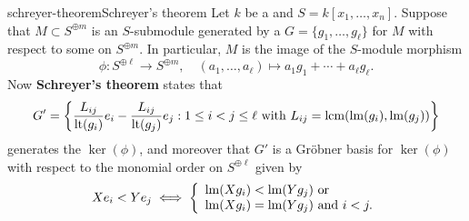\begin{topic}{schreyer-theorem}{Schreyer's theorem}
    Let $k$ be a  and $S = k[x_1, \ldots, x_n]$.
    Suppose that $M \subset S^{\oplus m}$ is an $S$-submodule generated by a  $G = \{ g_1, \ldots, g_\ell \}$ for $M$ with respect to some  on $S^{\oplus m}$. In particular, $M$ is the image of the $S$-module morphism
    \[ \phi \colon S^{\oplus \ell} \to S^{\oplus m}, \quad (a_1, \ldots, a_\ell) \mapsto a_1 g_1 + \cdots + a_\ell g_\ell . \]
    Now \textbf{Schreyer's theorem} states that
    \[ G' = \left\{ \frac{L_{ij}}{\operatorname{lt}(g_i)} e_i - \frac{L_{ij}}{\operatorname{lt}(g_j)} e_j : 1 \le i < j \le \ell \textup{ with } L_{ij} = \operatorname{lcm}(\operatorname{lm}(g_i), \operatorname{lm}(g_j)) \right\} \]
    generates the  $\ker(\phi)$, and moreover that $G'$ is a Gröbner basis for $\ker(\phi)$ with respect to the monomial order on $S^{\oplus \ell}$ given by
    \[ X e_i < Y e_j \iff \left\{ \begin{array}{l} \operatorname{lm}(X g_i) < \operatorname{lm}(Y g_j) \textup{ or } \\ \operatorname{lm}(X g_i) = \operatorname{lm}(Y g_j) \textup{ and } i < j . \end{array} \right. \]
\end{topic}
